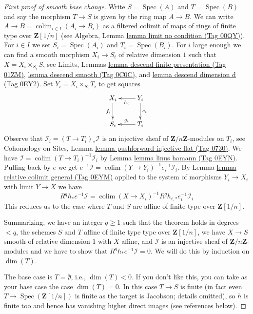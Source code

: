 \documentclass{amsart}
\theoremstyle{plain}
\theoremstyle{definition}
\theoremstyle{remark}
\numberwithin{equation}{subsection}
\def\colim{\mathop{\mathrm{colim}}\nolimits}
\def\Spec{\mathop{\mathrm{Spec}}}
\begin{document}
\begin{proof}[First proof of smooth base change]
\medskip\noindent
Write $S = \Spec(A)$ and $T = \Spec(B)$ and say the morphism
$T \to S$ is given by the ring map $A \to B$. We can write
$A \to B = \colim_{i \in I} (A_i \to B_i)$ as a filtered
colimit of maps of rings of finite type over $\mathbf{Z}[1/n]$
(see Algebra, Lemma \href{https://stacks.math.columbia.edu/tag/00QY}{lemma limit no condition (Tag 00QY)}).
For $i \in I$ we set $S_i = \Spec(A_i)$ and $T_i = \Spec(B_i)$.
For $i$ large enough we can find a smooth morphism $X_i \to S_i$
of relative dimension $1$ such that $X = X_i \times_{S_i} S$, see
Limits, Lemmas \href{https://stacks.math.columbia.edu/tag/01ZM}{lemma descend finite presentation (Tag 01ZM)},
\href{https://stacks.math.columbia.edu/tag/0C0C}{lemma descend smooth (Tag 0C0C)}, and
\href{https://stacks.math.columbia.edu/tag/0EY2}{lemma descend dimension d (Tag 0EY2)}. Set $Y_i = X_i \times_{S_i} T_i$
to get squares
$$
\xymatrix{
X_i \ar[d]_{f_i} & Y_i \ar[l]^{h_i} \ar[d]^{e_i} \\
S_i & T_i \ar[l]_{g_i}
}
$$
Observe that $\mathcal{I}_i = (T \to T_i)_*\mathcal{I}$
is an injective sheaf of $\mathbf{Z}/n\mathbf{Z}$-modules on
$T_i$, see Cohomology on Sites, Lemma
\href{https://stacks.math.columbia.edu/tag/0730}{lemma pushforward injective flat (Tag 0730)}.
We have $\mathcal{I} = \colim (T \to T_i)^{-1}\mathcal{I}_i$
by Lemma \href{https://stacks.math.columbia.edu/tag/0EYN}{lemma linus hamann (Tag 0EYN)}. Pulling back by $e$ we get
$e^{-1}\mathcal{I} = \colim (Y \to Y_i)^{-1}e_i^{-1}\mathcal{I}_i$.
By Lemma \href{https://stacks.math.columbia.edu/tag/0EYM}{lemma relative colimit general (Tag 0EYM)} applied to the system
of morphisms $Y_i \to X_i$ with limit $Y \to X$ we have
$$
R^qh_*e^{-1}\mathcal{I} =
\colim (X \to X_i)^{-1} R^qh_{i, *} e_i^{-1}\mathcal{I}_i
$$
This reduces us to the case where $T$ and $S$ are affine of finite
type over $\mathbf{Z}[1/n]$.

\medskip\noindent
Summarizing, we have an integer $q \geq 1$ such that the theorem holds
in degrees $< q$, the schemes $S$ and $T$ affine of finite type
type over $\mathbf{Z}[1/n]$, we have
$X \to S$ smooth of relative dimension $1$ with $X$ affine, and
$\mathcal{I}$ is an injective sheaf of $\mathbf{Z}/n\mathbf{Z}$-modules
and we have to show that $R^qh_*e^{-1}\mathcal{I} = 0$.
We will do this by induction on $\dim(T)$.

\medskip\noindent
The base case is $T = \emptyset$, i.e., $\dim(T) < 0$.
If you don't like this, you can take as your base case
the case $\dim(T) = 0$. In this case $T \to S$ is finite
(in fact even $T \to \Spec(\mathbf{Z}[1/n])$ is finite as the
target is Jacobson; details omitted), so
$h$ is finite too and hence has
vanishing higher direct images (see references below).


\end{proof}
\end{document}

